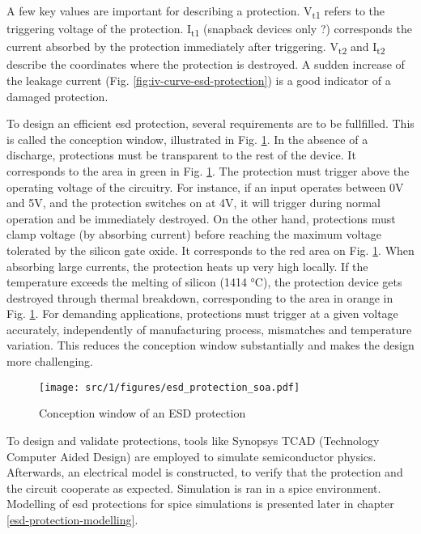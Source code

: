 A few key values are important for describing a protection.
V\textsubscript{t1} refers to the triggering voltage of the protection.
I\textsubscript{t1} (snapback devices only ?) corresponds the current absorbed by the protection immediately after triggering.
V\textsubscript{t2} and I\textsubscript{t2} describe the coordinates where the protection is destroyed.
A sudden increase of the leakage current (Fig. \ref{fig:iv-curve-esd-protection}) is a good indicator of a damaged protection.


To design an efficient \gls{esd} protection, several requirements are to be fullfilled.
This is called the conception window, illustrated in Fig. \ref{fig:soa-esd-protection}.
In the absence of a discharge, protections must be transparent to the rest of the device.
It corresponds to the area in green in Fig. \ref{fig:soa-esd-protection}.
The protection must trigger above the operating voltage of the circuitry.
For instance, if an input operates between 0V and 5V, and the protection switches on at 4V, it will trigger during normal operation and be immediately destroyed.
On the other hand, protections must clamp voltage (by absorbing current) before reaching the maximum voltage tolerated by the silicon gate oxide.
It corresponds to the red area on Fig. \ref{fig:soa-esd-protection}.
When absorbing large currents, the protection heats up very high locally.
If the temperature exceeds the melting of silicon (1414 °C), the protection device gets destroyed through thermal breakdown, corresponding to the area in orange in Fig. \ref{fig:soa-esd-protection}.
For demanding applications, protections must trigger at a given voltage accurately, independently of manufacturing process, mismatches and temperature variation.
This reduces the conception window substantially and makes the design more challenging.

\begin{figure}[!h]
  \centering
  \texttt{[image: src/1/figures/esd\_protection\_soa.pdf]}
  \caption{Conception window of an ESD protection}
  \label{fig:soa-esd-protection}
\end{figure}

To design and validate protections, tools like Synopsys TCAD (Technology Computer Aided Design) \cite{tcad} are employed to simulate semiconductor physics.
Afterwards, an electrical model is constructed, to verify that the protection and the circuit cooperate as expected.
Simulation is ran in a \gls{spice} environment.
Modelling of \gls{esd} protections for \gls{spice} simulations is presented later in chapter \ref{esd-protection-modelling}.
